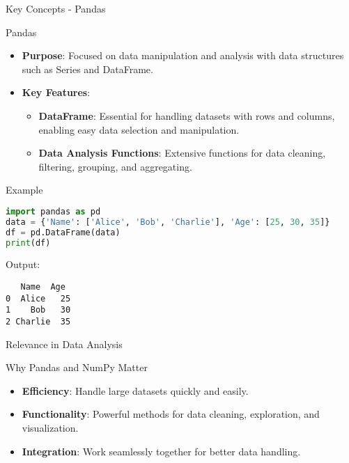 \documentclass[aspectratio=169]{beamer}
\begin{document}
\begin{frame}{Key Concepts - Pandas}
    \begin{block}{Pandas}
        \begin{itemize}
            \item \textbf{Purpose}: Focused on data manipulation and analysis with data structures such as Series and DataFrame.
            \item \textbf{Key Features}:
                \begin{itemize}
                    \item \textbf{DataFrame}: Essential for handling datasets with rows and columns, enabling easy data selection and manipulation.
                    \item \textbf{Data Analysis Functions}: Extensive functions for data cleaning, filtering, grouping, and aggregating.
                \end{itemize}
        \end{itemize}
    \end{block}
    \begin{block}{Example}
        \begin{lstlisting}[language=Python]
import pandas as pd
data = {'Name': ['Alice', 'Bob', 'Charlie'], 'Age': [25, 30, 35]}
df = pd.DataFrame(data)
print(df)
        \end{lstlisting}
        Output:
        \begin{verbatim}
   Name  Age
0  Alice   25
1    Bob   30
2 Charlie  35
        \end{verbatim}
    \end{block}
\end{frame}

\begin{frame}{Relevance in Data Analysis}
    \begin{block}{Why Pandas and NumPy Matter}
        \begin{itemize}
            \item \textbf{Efficiency}: Handle large datasets quickly and easily.
            \item \textbf{Functionality}: Powerful methods for data cleaning, exploration, and visualization.
            \item \textbf{Integration}: Work seamlessly together for better data handling.
        \end{itemize}
    \end{block}
\end{frame}
\end{document}
